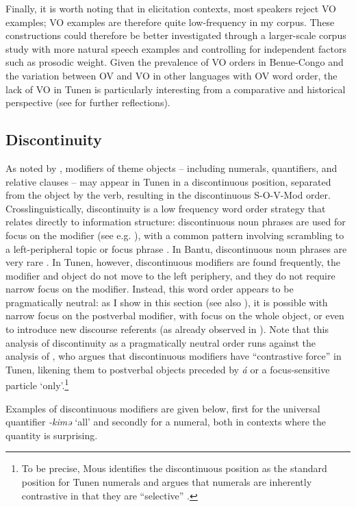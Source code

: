 \documentclass[output=paper,colorlinks,citecolor=brown
]{langscibook}
\begin{document}
Finally, it is worth noting that in elicitation contexts, most speakers reject VO examples; VO examples are therefore quite low-frequency in my corpus. These constructions could therefore be better investigated through a larger-scale corpus study with more natural speech examples and controlling for independent factors such as prosodic weight. Given the prevalence of VO orders in Benue-Congo and the variation between OV and VO in other languages with OV word order, the lack of VO in Tunen is particularly interesting from a comparative and historical perspective (see \citealp[Chapter 6]{KerrFut} for further reflections).


\subsection{Discontinuity} \label{secdiscon}
As noted by \citet{Mous1997}, modifiers of theme objects -- including numerals, quantifiers, and relative clauses -- may appear in Tunen in a discontinuous position, separated from the object by the verb, resulting in the discontinuous S-O-V-Mod order. Crosslinguistically, discontinuity is a low frequency word order strategy that relates directly to information structure: discontinuous noun phrases are used for focus on the modifier (see e.g. \citealt{LouagieVerstraete2016}), with a common pattern involving scrambling to a left-peripheral topic or focus phrase \citep{FanselowĆavar2002}. In Bantu, discontinuous noun phrases are very rare \citep[909]{VandeVelde2022}. In Tunen, however, discontinuous modifiers are found frequently, the modifier and object do not move to the left periphery, and they do not require narrow focus on the modifier. Instead, this word order appears to be pragmatically neutral: as I show in this section (see also \citealp[Chapter 7]{KerrFut}), it is possible with narrow focus on the postverbal modifier, with focus on the whole object, or even to introduce new discourse referents (as already observed in \citealt{Isaac2007}). Note that this analysis of discontinuity as a pragmatically neutral order runs against the analysis of \citet[133]{Mous1997}, who argues that discontinuous modifiers have ``contrastive force'' in Tunen, likening them to postverbal objects preceded by \textit{á} or a focus-sensitive particle `only'.\footnote{To be precise, Mous identifies the discontinuous position as the standard position for Tunen numerals and argues that numerals are inherently contrastive in that they are ``selective'' \citep{Mous1997}.}

Examples of discontinuous modifiers are given below, first for the universal quantifier  \textit{-kimə} `all' and secondly for a numeral, both in contexts where the quantity is surprising.\largerpage
\end{document}

